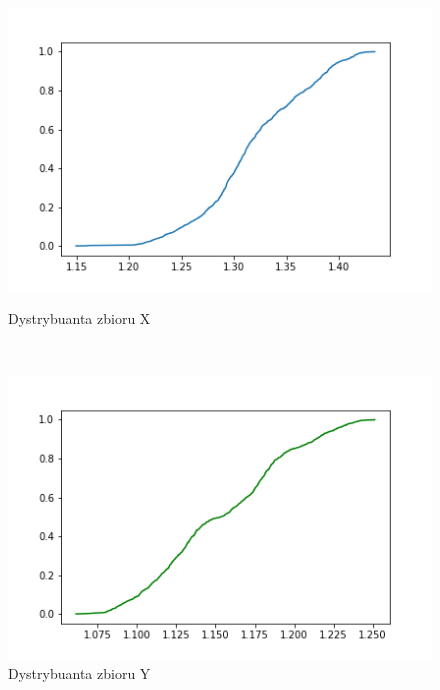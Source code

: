 \documentclass[12pt]{mwart}
\begin{document}
\begin{figure}[H]
	\begin{minipage}{.5\linewidth}
		\centering
		\includegraphics[scale=0.7]{X_cdf.PNG}
		\caption{Dystrybuanta zbioru X}
	\end{minipage}
	$\quad$
	\begin{minipage}{.5\linewidth}
		\centering
		\includegraphics[scale=0.7]{Y_cdf.PNG}
		\caption{Dystrybuanta zbioru Y}
	\end{minipage}
\end{figure}
\end{document}

